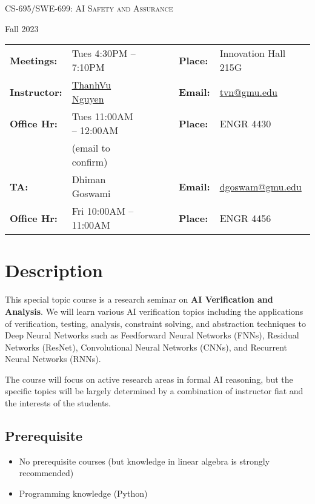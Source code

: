 \documentclass[11pt]{article}
\begin{document}
\begin{center}
{\Large \textsc{CS-695/SWE-699: AI Safety and Assurance}}
\end{center}
\begin{center}
Fall 2023
\end{center}

\begin{center}
\begin{minipage}[t]{.75\textwidth}
\begin{tabular}{llcccll}
  \toprule
  \textbf{Meetings:} & Tues 4:30PM -- 7:10PM  & & & & \textbf{Place:} & Innovation Hall 215G\\
\textbf{Instructor:} & \href{https://go.gmu.edu/tvn}{ThanhVu Nguyen} & & &  & \textbf{Email:} &  \href{mailto:tvn@gmu.edu}{tvn@gmu.edu}\\
\textbf{Office Hr:} & Tues 11:00AM -- 12:00AM & & & & \textbf{Place:} & ENGR 4430\\
&(email to confirm)&&&&&\\
\midrule
\textbf{TA:} & Dhiman Goswami & & &  & \textbf{Email:} &  \href{mailto:dgoswam@gmu.edu}{dgoswam@gmu.edu}\\
\textbf{Office Hr:} & Fri 10:00AM -- 11:00AM  & & & & \textbf{Place:} & ENGR 4456\\
\bottomrule
\end{tabular}
\end{minipage}
\end{center}


\section{Description}
This special topic course is a research seminar on \textbf{\textbf{AI Verification and Analysis}}.
We will learn various AI verification topics including the applications
of verification, testing, analysis, constraint solving, and abstraction
techniques to Deep Neural Networks such as Feedforward Neural Networks
(FNNs), Residual Networks (ResNet), Convolutional Neural Networks
(CNNs), and Recurrent Neural Networks (RNNs).

The course will focus on active research areas in formal AI reasoning,
but the specific topics will be largely determined by a
combination of instructor fiat and the interests of the students.




\subsection*{Prerequisite}
\begin{itemize}
\item No prerequisite courses (but knowledge in linear algebra is strongly recommended)
\item Programming knowledge (Python)
\end{itemize}
\end{document}
